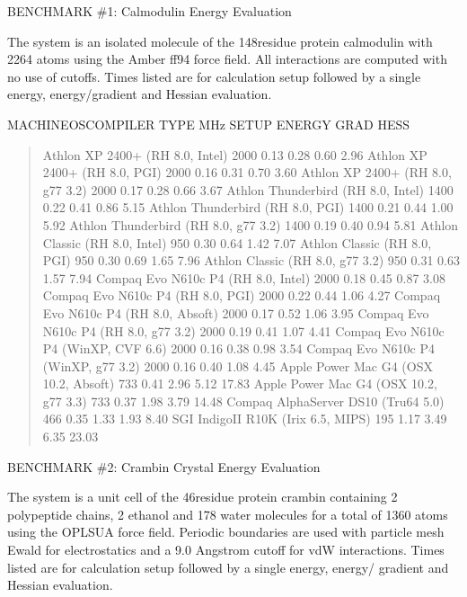 \documentclass[letterpaper,11pt,english]{sphinxmanual}
\begin{document}
BENCHMARK \#1:  Calmodulin Energy Evaluation

The system is an isolated molecule of the 148\sphinxhyphen{}residue protein calmodulin with 2264 atoms using the Amber ff94 force field. All interactions are computed with no use of cutoffs. Times listed are for calculation setup followed by a single energy, energy/gradient and Hessian evaluation.

MACHINE\sphinxhyphen{}OS\sphinxhyphen{}COMPILER TYPE        MHz     SETUP   ENERGY  GRAD    HESS
\begin{quote}

Athlon XP 2400+ (RH 8.0, Intel)        2000    0.13    0.28    0.60    2.96
Athlon XP 2400+ (RH 8.0, PGI)  2000    0.16    0.31    0.70    3.60
Athlon XP 2400+ (RH 8.0, g77 3.2)      2000    0.17    0.28    0.66    3.67
Athlon Thunderbird (RH 8.0, Intel)     1400    0.22    0.41    0.86    5.15
Athlon Thunderbird (RH 8.0, PGI)       1400    0.21    0.44    1.00    5.92
Athlon Thunderbird (RH 8.0, g77 3.2)   1400    0.19    0.40    0.94    5.81
Athlon Classic (RH 8.0, Intel) 950     0.30    0.64    1.42    7.07
Athlon Classic (RH 8.0, PGI)   950     0.30    0.69    1.65    7.96
Athlon Classic (RH 8.0, g77 3.2)       950     0.31    0.63    1.57    7.94
Compaq Evo N610c P4 (RH 8.0, Intel)    2000    0.18    0.45    0.87    3.08
Compaq Evo N610c P4 (RH 8.0, PGI)      2000    0.22    0.44    1.06    4.27
Compaq Evo N610c P4 (RH 8.0, Absoft)   2000    0.17    0.52    1.06    3.95
Compaq Evo N610c P4 (RH 8.0, g77 3.2)  2000    0.19    0.41    1.07    4.41
Compaq Evo N610c P4 (WinXP, CVF 6.6)   2000    0.16    0.38    0.98    3.54
Compaq Evo N610c P4 (WinXP, g77 3.2)   2000    0.16    0.40    1.08    4.45
Apple Power Mac G4 (OSX 10.2, Absoft)  733     0.41    2.96    5.12    17.83
Apple Power Mac G4 (OSX 10.2, g77 3.3) 733     0.37    1.98    3.79    14.48
Compaq AlphaServer DS10 (Tru64 5.0)    466     0.35    1.33    1.93    8.40
SGI IndigoII R10K (Irix 6.5, MIPS)     195     1.17    3.49    6.35    23.03
\end{quote}

BENCHMARK \#2:  Crambin Crystal Energy Evaluation

The system is a unit cell of the 46\sphinxhyphen{}residue protein crambin containing 2 polypeptide chains, 2 ethanol and 178 water molecules for a total of 1360 atoms using the OPLS\sphinxhyphen{}UA force field. Periodic boundaries are used with particle mesh Ewald for electrostatics and a 9.0 Angstrom cutoff for vdW interactions. Times listed are for calculation setup followed by a single energy, energy/ gradient and Hessian evaluation.
\end{document}
